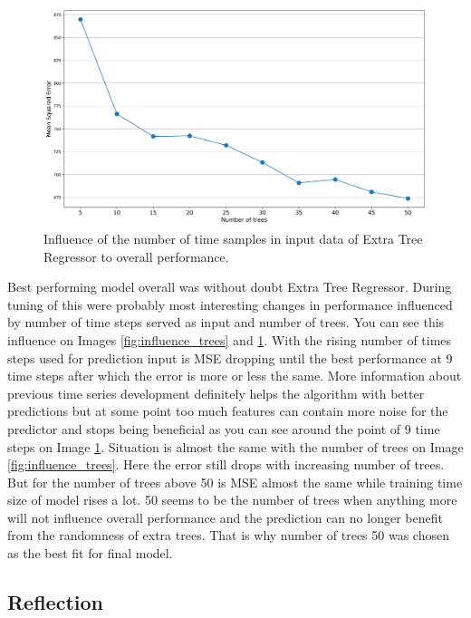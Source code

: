 \documentclass{article}
\begin{document}
\begin{figure}[h!]
\centering
\includegraphics[width=16cm]{imgs/trees_vs_mse.png}
\caption{Influence of the number of time samples in input data of Extra Tree Regressor to overall performance.}
\label{fig:influence_ts}
\end{figure}

Best performing model overall was without doubt Extra Tree Regressor. During tuning of this were probably most interesting changes in performance influenced by number of time steps served as input and number of trees. You can see this influence on Images \ref{fig:influence_trees} and \ref{fig:influence_ts}. With the rising number of times steps used for prediction input is MSE dropping until the best performance at 9 time steps after which the error is more or less the same. More information about previous time series development definitely helps the algorithm with better predictions but at some point too much features can contain more noise for the predictor and stops being beneficial as you can see around the point of 9 time steps on Image \ref{fig:influence_ts}. Situation is almost the same with the number of trees on Image \ref{fig:influence_trees}. Here the error still drops with increasing number of trees. But for the number of trees above 50 is MSE almost the same while training time size of model rises a lot. 50 seems to be the number of trees when anything more will not influence overall performance and the prediction can no longer benefit from the randomness of extra trees. That is why number of trees 50 was chosen as the best fit for final model.


\subsection{Reflection}
\end{document}
